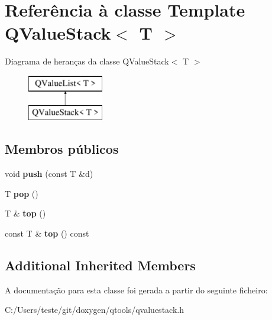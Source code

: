 \hypertarget{class_q_value_stack}{\section{Referência à classe Template Q\-Value\-Stack$<$ T $>$}
\label{class_q_value_stack}
}
Diagrama de heranças da classe Q\-Value\-Stack$<$ T $>$\begin{figure}[H]
\begin{center}
\leavevmode
\includegraphics[height=2.000000cm]{class_q_value_stack}
\end{center}
\end{figure}
\subsection*{Membros públicos}
\begin{DoxyCompactItemize}
\item 
\hypertarget{class_q_value_stack_a538cb4163aeecfee2bdf0e18da226f66}{void {\bfseries push} (const T \&d)}\label{class_q_value_stack_a538cb4163aeecfee2bdf0e18da226f66}

\item 
\hypertarget{class_q_value_stack_ad702374ab51a03308e76cc7305f42582}{T {\bfseries pop} ()}\label{class_q_value_stack_ad702374ab51a03308e76cc7305f42582}

\item 
\hypertarget{class_q_value_stack_a3cf7365af88634dc340669ed5e0193b4}{T \& {\bfseries top} ()}\label{class_q_value_stack_a3cf7365af88634dc340669ed5e0193b4}

\item 
\hypertarget{class_q_value_stack_a3c3312291fc9a17b0256c985deab1174}{const T \& {\bfseries top} () const }\label{class_q_value_stack_a3c3312291fc9a17b0256c985deab1174}

\end{DoxyCompactItemize}
\subsection*{Additional Inherited Members}


A documentação para esta classe foi gerada a partir do seguinte ficheiro\-:\begin{DoxyCompactItemize}
\item 
C\-:/\-Users/teste/git/doxygen/qtools/qvaluestack.\-h\end{DoxyCompactItemize}
